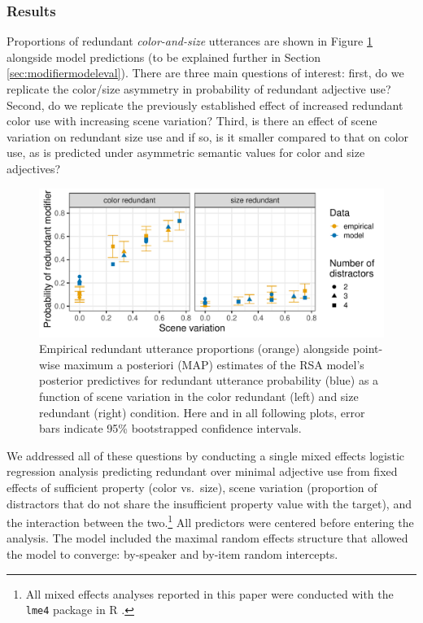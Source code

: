 \documentclass[11pt]{article}
\newcommand{\figref}[1]{Figure \ref{#1}}
\newcommand{\sectionref}[1]{Section \ref{#1}}
\begin{document}
\subsubsection{Results}
\label{sec:modelempiricalresults}

Proportions of redundant \emph{color-and-size} utterances are shown in \figref{fig:exp1results} alongside model predictions (to be explained further in \sectionref{sec:modifiermodeleval}). There are three main questions of interest: first, do we replicate the color/size asymmetry in probability of redundant adjective use? Second, do we replicate the previously established effect of increased redundant color use with increasing scene variation? Third, is there an effect of scene variation on redundant size use and if so, is it smaller compared to that on color use, as is predicted under asymmetric semantic values for color and size adjectives?

\begin{figure}
\centering
\includegraphics[width=.8\textwidth]{pics/exp1-empirical-predictives}
\caption{Empirical redundant utterance proportions  (orange)  alongside point-wise maximum a posteriori (MAP) estimates of the RSA model's posterior predictives for redundant utterance probability (blue) as a function of scene variation in the color redundant (left) and size redundant (right) condition. Here and in all following plots, error bars indicate 95\% bootstrapped confidence intervals.}
\label{fig:exp1results}
\end{figure}

We addressed all of these questions by conducting a single mixed effects logistic regression analysis predicting redundant over minimal adjective use from fixed effects of sufficient property (color vs.~size), scene variation (proportion of distractors that do not share the insufficient property value with the target), and the interaction between the two.\footnote{All mixed effects analyses reported in this paper were conducted with the \verb+lme4+ package \cite{lme4} in R \cite{R}.} All predictors were centered before entering the analysis. The model included the maximal random effects structure that allowed the model to converge: by-speaker and by-item random intercepts.
\end{document}

